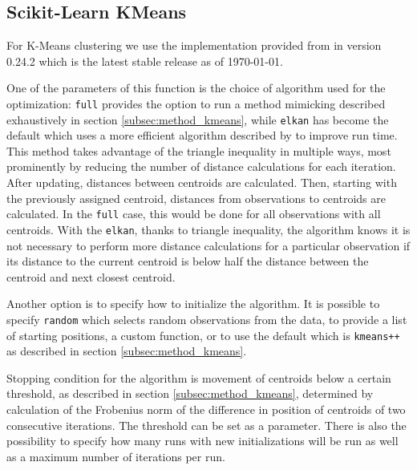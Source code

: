 \subsection{Scikit-Learn KMeans}
\label{subsec:sklearn_kmeans}

For K-Means clustering we use the implementation provided from \cite{sklearn_api} in version 0.24.2 which is the latest stable release as of \today. 

One of the parameters of this function is the choice of algorithm used for the optimization: \texttt{full} provides the option to run a method mimicking \cite{lloyd1982least} described exhaustively in section \ref{subsec:method_kmeans}, while \texttt{elkan} has become the default which uses a more efficient algorithm described by \cite{elkan2003using} to improve run time. This method takes advantage of the triangle inequality in multiple ways, most prominently by reducing the number of distance calculations for each iteration. After updating, distances between centroids are calculated. Then, starting with the previously assigned centroid, distances from observations to centroids are calculated. In the \texttt{full} case, this would be done for all observations with all centroids. With the \texttt{elkan}, thanks to triangle inequality, the algorithm knows it is not necessary to perform more distance calculations for a particular observation if its distance to the current centroid is below half the distance between the centroid and next closest centroid.

Another option is to specify how to initialize the algorithm. It is possible to specify \texttt{random} which selects random observations from the data, to provide a list of starting positions, a custom function, or to use the default which is \texttt{kmeans++} as described in section \ref{subsec:method_kmeans}.

Stopping condition for the algorithm is movement of centroids below a certain threshold, as described in section \ref{subsec:method_kmeans}, determined by calculation of the Frobenius norm of the difference in position of centroids  of two consecutive iterations. The threshold can be set as a parameter. There is also the possibility to specify how many runs with new initializations will be run as well as a maximum number of iterations per run.

